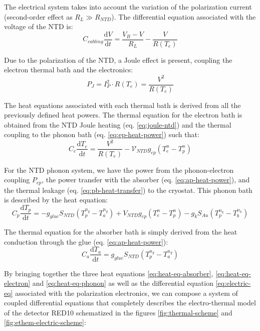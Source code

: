 The electrical system takes into account the variation of the polarization current (second-order effect as $R_L \gg R_{NTD}$).
The differential equation associated with the voltage of the NTD is:
\begin{equation}
\label{eq:electric-eq}
C_{cabling} \frac{\mathrm{d} V}{\mathrm{d} t} = \frac{V_B - V}{R_L} - \frac{V}{R(T_e)}
\end{equation}

Due to the polarization of the NTD, a Joule effect is present, coupling the electron thermal bath and the electronics:
\begin{equation}
\label{eq:joule-ntd}
P_J= I_P^2 \cdot R(T_e)= \frac{V^2}{R(T_e)}
\end{equation}

The heat equations associated with each thermal bath is derived from all the previously defined heat powers. 
The thermal equation for the electron bath is obtained from the NTD Joule heating (eq. \ref{eq:joule-ntd}) and the thermal coupling to the phonon bath (eq. \ref{eq:ep-heat-power}) such that:
\begin{equation}
\label{eq:heat-eq-electron}
 C_e \frac{\mathrm{d} T_e}{\mathrm{d} t} = \frac{V^2}{R(T_e)} - \mathcal{V}_{NTD} g_{ep} \left( T_e^{n} - T_p^{n} \right)
\end{equation}

For the NTD phonon system, we have the power from the phonon-electron coupling $P_{ep}$, the power transfer with the absorber (eq. \ref{eq:ap-heat-power}), and the thermal leakage (eq. \ref{eq:pb-heat-transfer}) to the cryostat. This phonon bath is described by the heat equation:
\begin{equation}
\label{eq:heat-eq-phonon}
C_p \frac{\mathrm{d} T_p}{\mathrm{d} t}
=
-g_{glue} S_{NTD} \left( T_p^{n_g} - T_a^{n_g} \right) 
+ V_{NTD} g_{ep} \left( T_e^{n} - T_p^{n} \right)
- g_k S_{Au} \left( T_p^{n_k} - T_b^{n_k} \right)
\end{equation}

The thermal equation for the absorber bath is simply derived from the heat conduction through the glue (eq. \ref{eq:ap-heat-power}):
\begin{equation}
\label{eq:heat-eq-absorber}
C_a \frac{\mathrm{d} T_a}{\mathrm{d} t} = g_{glue} S_{NTD} \left( T_p^{n_g} - T_a^{n_g} \right)
\end{equation}

By bringing together the three heat equations \ref{eq:heat-eq-absorber}, \ref{eq:heat-eq-electron} and \ref{eq:heat-eq-phonon} as well as the differential equation \ref{eq:electric-eq} associated with the polarization electronics, we can compose a system of coupled differential equations that completely describes the electro-thermal model of the detector RED10 schematized in the figures \ref{fig:thermal-scheme} and \ref{fig:ethem-electric-scheme}:

